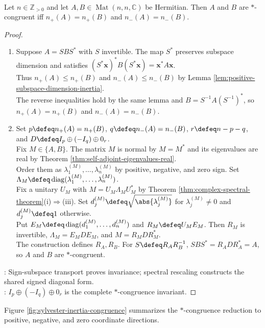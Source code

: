 \begin{theorem} \label{thm:sylvester-inertia-theorem-hermitian} \\
Let $n\in\mathbb{Z}_{>0}$ and let $A,B\in\operatorname{Mat}(n,n,\mathbb{C})$ be Hermitian. Then $A$ and $B$ are $*$-congruent iff $n_+(A)=n_+(B)$ and $n_-(A)=n_-(B)$.
\begin{proof}
\begin{enumerate}[label=\roman*.]
\setlength{\itemsep}{0pt}
\item[$(\Rightarrow)$] Suppose $A=SBS^*$ with $S$ invertible. The map $S^*$ preserves subspace dimension and satisfies $(S^*\mathbf{x})^*B(S^*\mathbf{x})=\mathbf{x}^*A\mathbf{x}$.\\
Thus $n_+(A)\leq n_+(B)$ and $n_-(A)\leq n_-(B)$ by Lemma \ref{lem:positive-subspace-dimension-inertia}.\\
The reverse inequalities hold by the same lemma and $B=S^{-1}A(S^{-1})^*$, so $n_+(A)=n_+(B)$ and $n_-(A)=n_-(B)$.
\item[$(\Leftarrow)$] Set $p\defeq n_+(A)=n_+(B)$, $q\defeq n_-(A)=n_-(B)$, $r\defeq n-p-q$, and $D\defeq I_p\oplus(-I_q)\oplus0_r$.\\
Fix $M\in\{A,B\}$. The matrix $M$ is normal by $M=M^*$ and its eigenvalues are real by Theorem \ref{thm:self-adjoint-eigenvalues-real}.\\
Order them as $\lambda_1^{(M)},\ldots,\lambda_n^{(M)}$ by positive, negative, and zero sign. Set $\Lambda_M\defeq\operatorname{diag}(\lambda_1^{(M)},\ldots,\lambda_n^{(M)})$.\\
Fix a unitary $U_M$ with $M=U_M\Lambda_MU_M^*$ by Theorem \ref{thm:complex-spectral-theorem}(i)$\Rightarrow$(iii). Set $d_j^{(M)}\defeq\sqrt{\abs{\lambda_j^{(M)}}}$ for $\lambda_j^{(M)}\neq0$ and $d_j^{(M)}\defeq1$ otherwise.\\
Put $E_M\defeq\operatorname{diag}(d_1^{(M)},\ldots,d_n^{(M)})$ and $R_M\defeq U_ME_M$. Then $R_M$ is invertible, $\Lambda_M=E_MDE_M$, and $M=R_MDR_M^*$.\\
The construction defines $R_A,R_B$. For $S\defeq R_AR_B^{-1}$, $SBS^*=R_ADR_A^*=A$, so $A$ and $B$ are $*$-congruent.
\end{enumerate}
: Sign-subspace transport proves invariance; spectral rescaling constructs the shared signed diagonal form.\\
: $I_p\oplus(-I_q)\oplus0_r$ is the complete $*$-congruence invariant.
\end{proof}
\end{theorem}

Figure \ref{fig:sylvester-inertia-congruence} summarizes the $*$-congruence reduction to positive, negative, and zero coordinate directions.

\begin{illustrationfigure}[H]
  \centering
  
  \caption{$*$-congruence reduces a Hermitian form to signed coordinate axes.}
  \label{fig:sylvester-inertia-congruence}
\end{illustrationfigure}
